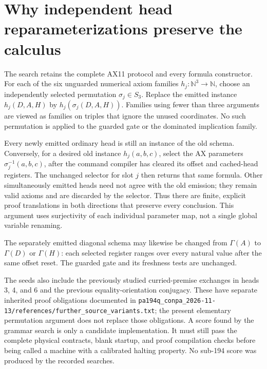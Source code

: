 \section{Why independent head reparameterizations preserve the calculus}
The search retains the complete AX11 protocol and every formula constructor.
For each of the six unguarded numerical axiom families
\(h_j:\mathbb N^3\to\mathbb N\), choose an independently selected
permutation \(\sigma_j\in S_3\). Replace the emitted instance
\(h_j(D,A,H)\) by \(h_j(\sigma_j(D,A,H))\). Families using fewer
than three arguments are viewed as families on triples that ignore the
unused coordinates. No such permutation is applied to the guarded gate
or the dominated implication family.

Every newly emitted ordinary head is still an instance of the old
schema. Conversely, for a desired old instance \(h_j(a,b,c)\), select
the AX parameters \(\sigma_j^{-1}(a,b,c)\), after the command compiler
has cleared its offset and cached-head registers. The unchanged selector
for slot \(j\) then returns that same formula. Other simultaneously
emitted heads need not agree with the old emission; they remain valid
axioms and are discarded by the selector. Thus there are finite,
explicit proof translations in both directions that preserve every
conclusion. This argument uses surjectivity of each individual
parameter map, not a single global variable renaming.

The separately emitted diagonal schema may likewise be changed from
\(\Gamma(A)\) to \(\Gamma(D)\) or \(\Gamma(H)\): each selected
register ranges over every natural value after the same offset reset.
The guarded gate and its freshness tests are unchanged.

The seeds also include the previously studied curried-premise exchanges
in heads 3, 4, and 6 and the previous equality-orientation conjugacy.
These have separate inherited proof obligations documented in
\texttt{pa194q\_conpa\_2026-11-13/references/further\_source\_variants.txt};
the present elementary permutation argument does not replace those
obligations. A score found by the grammar search is only a candidate
implementation. It must still pass the complete physical contracts,
blank startup, and proof compilation checks before being called a machine
with a calibrated halting property. No sub-194 score was produced by the
recorded searches.
